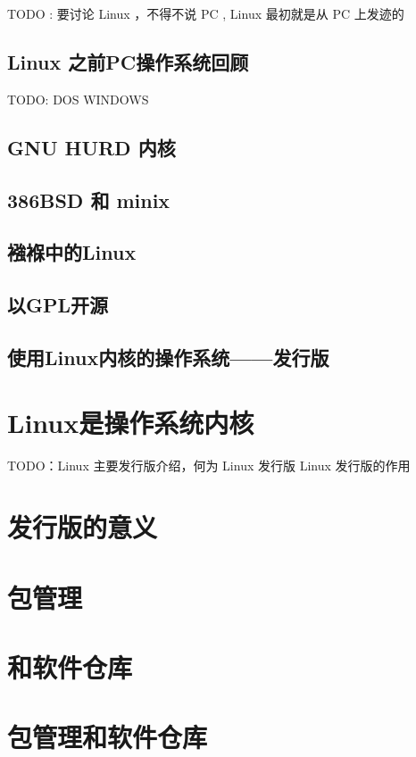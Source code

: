 \documentclass[amstex]{ctexbook}
\begin{document}
TODO :  要讨论 Linux ，不得不说 PC , Linux 最初就是从 PC 上发迹的

\subsection{Linux 之前PC操作系统回顾}

TODO:  DOS WINDOWS
\subsection{GNU HURD 内核}

 
\subsection{386BSD 和 minix}



\subsection{襁褓中的Linux}
\subsection{以GPL开源}

\subsection{使用Linux内核的操作系统——发行版}
\section{Linux是操作系统内核}

TODO：Linux 主要发行版介绍，何为 Linux 发行版 Linux 发行版的作用

\section{发行版的意义}
\section{包管理}
\section{和软件仓库}


\section{包管理和软件仓库}
\end{document}
